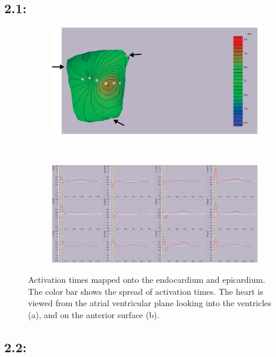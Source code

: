 \documentclass[12pt]{article}
\begin{document}
\subsection{2.1: }
\begin{figure}[H]
	\begin{subfigure}{.95\textwidth}
		\centering
		\includegraphics[width=.95\linewidth]{Figures/2_1_bsp.png}
		\caption{}
		
	\end{subfigure}%
	\\
	\begin{subfigure}{.95\textwidth}
		\centering
		\includegraphics[width=.95\linewidth]{Figures/2_1_ecg.png}
		\caption{}
		
	\end{subfigure}
	\caption{Activation times mapped onto the endocardium and epicardium. The color bar shows the spread of activation times. The heart is viewed from the atrial ventricular plane looking into the ventricles (a), and on the anterior surface (b).}
	\label{2_1}
\end{figure}


\subsection{2.2: }
\end{document}
